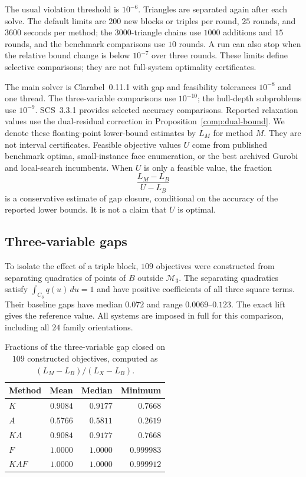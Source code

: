 The usual violation threshold is $10^{-6}$. Triangles are separated
again after each solve. The default limits are $200$ new blocks or
triples per round, $25$ rounds, and $3600$ seconds per method; the
$3000$-triangle chains use $1000$ additions and $15$ rounds, and the
benchmark comparisons use $10$ rounds. A run can also stop when the
relative bound change is below $10^{-7}$ over three rounds. These
limits define selective comparisons; they are not full-system
optimality certificates.

The main solver is Clarabel~0.11.1
\citep{GoulartChen2024,ClarabelSoftware2025} with gap and feasibility tolerances
$10^{-8}$ and one thread. The three-variable comparisons use
$10^{-10}$; the hull-depth subproblems use $10^{-9}$.
SCS~3.3.1 \citep{ODonoghueEtAl2016,SCSSoftware2026}
provides selected accuracy comparisons. Reported relaxation
values use the dual-residual correction in
Proposition~\ref{comp:dual-bound}. We denote these floating-point
lower-bound estimates by $L_M$ for method $M$. They are not interval
certificates. Feasible objective values $U$ come from published benchmark
optima, small-instance face enumeration, or the best archived Gurobi and
local-search incumbents. When $U$ is only a feasible value, the fraction
\begin{equation}\label{comp:closure}
 \frac{L_M-L_B}{U-L_B}
\end{equation}
is a conservative estimate of gap closure, conditional on the accuracy
of the reported lower bounds. It is not a claim that $U$ is optimal.

\subsection{Three-variable gaps}
\label{comp:three-variable-results}

To isolate the effect of a triple block, $109$ objectives were constructed
from separating quadratics of points of $B$ outside
$\mathcal M_3$. The separating quadratics satisfy
$\int_{C_3}q(u)\,du=1$ and have positive coefficients of all three
square terms. Their baseline
gaps have median $0.072$ and range $0.0069$--$0.123$.
The exact lift gives the reference value. All systems are imposed in
full for this comparison, including all $24$ family orientations.

\begin{table}[htbp]
\centering
\caption{Fractions of the three-variable gap closed on $109$ constructed
objectives, computed as $(L_M-L_B)/(L_X-L_B)$.}
\label{comp:hard-three-table}
\begin{tabular}{lrrr}
\toprule
Method & Mean & Median & Minimum\\
\midrule
$K$   & $0.9084$ & $0.9177$ & $0.7668$\\
$A$   & $0.5766$ & $0.5811$ & $0.2619$\\
$KA$  & $0.9084$ & $0.9177$ & $0.7668$\\
$F$   & $1.0000$ & $1.0000$ & $0.999983$\\
$KAF$ & $1.0000$ & $1.0000$ & $0.999912$\\
\bottomrule
\end{tabular}
\end{table}

